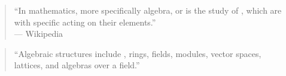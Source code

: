 
\begin{frame}{}
  \begin{quote}
    ``In mathematics, more specifically algebra,
     or 
    is the study of ,
    which are  with specific 
    acting on their elements.'' \\
    \hfill --- Wikipedia
  \end{quote}

  \pause
  \vspace{0.80cm}
  \begin{quote}
    ``Algebraic structures include ,
    rings, fields, modules, vector spaces,
    lattices, and algebras over a field.''
  \end{quote}
\end{frame}

\begin{frame}{}
\end{frame}

\begin{frame}{}
  \begin{quote}
    \begin{center}
    \end{center}
  \end{quote}

  \begin{columns}
      \begin{center}
      \end{center}
      \begin{center}
      \end{center}
  \end{columns}
\end{frame}

